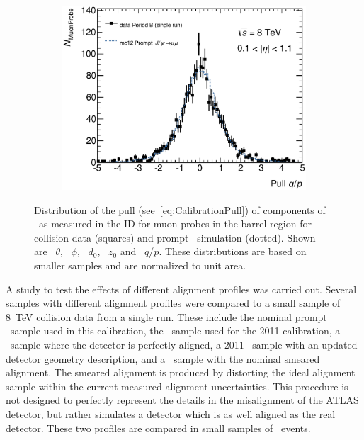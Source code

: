 \begin{figure}[htbp]
    \begin{subfigure}[b]{0.49\textwidth}
      \includegraphics[width=\textwidth]{PartCalibration2012/Plots/DiscrepancyStudy/Pull/h_pull_qoverp_Nominal.eps}
      \caption{} \label{fig:CalibrationPullPt}
    \end{subfigure}
    \caption[Distribution of the pull of components of \xsd\ as measured in the ID for muon probes in the barrel region for collision data (squares) and prompt \jpsi\ simulation (dotted).]{Distribution of the pull (see~\ref{eq:CalibrationPull}) of components of \xsd\ as measured in the ID for muon probes in the barrel region for collision data (squares) and prompt \jpsi\ simulation (dotted). Shown are~ $\theta$,~ $\phi$,~ $d_{0}$,~ $z_{0}$ and~ $q$/$p$. These distributions are based on smaller samples and are normalized to unit area.}
  \label{fig:CalibrationPull}
\end{figure}

A study to test the effects of different alignment profiles was carried out. Several samples with different alignment profiles were compared to a small sample of \SI{8}{\TeV} collision data from a single run. These include the nominal prompt \jpsi\ sample used in this calibration, the \jpsi\ sample used for the 2011 calibration, a \ZMu\ sample where the detector is perfectly aligned, a 2011 \ZMu\ sample with an updated detector geometry description, and a \ZMu\ sample with the nominal smeared alignment. The smeared alignment is produced by distorting the ideal alignment sample within the current measured alignment uncertainties. This procedure is not designed to perfectly represent the details in the misalignment of the ATLAS detector, but rather simulates a detector which is as well aligned as the real detector. These two profiles are compared in small samples of \ZMu\ events.

